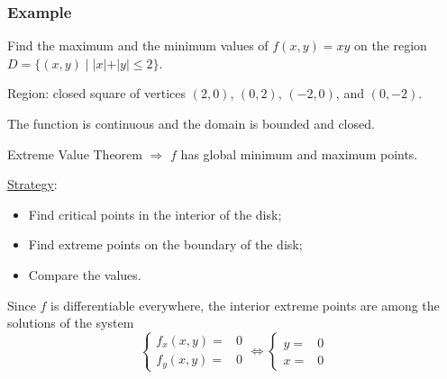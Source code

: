 

\begin{frame}
  \frametitle{Example}

Find the maximum and the minimum values of $f(x,y) = xy$ on the region $D = \{ (x,y) \; | \; |x|+|y| \leqslant 2 \}$.
\pause

Region: \pause closed square of vertices $(2,0)$, $(0,2)$, $(-2,0)$, and $(0,-2)$.

\pause

The function is continuous and the domain is bounded and closed.

Extreme Value Theorem $\Longrightarrow$ $f$ has global minimum and maximum points.

\pause
\underline{Strategy}:
%
\begin{itemize}
  \item Find critical points in the interior of the disk;
  \item Find extreme points on the boundary of the disk;
  \item Compare the values.
\end{itemize}

\pause
Since $f$ is differentiable everywhere, the interior extreme points are among the solutions of the system
%
$$\left\{
\begin{array}{ll}
  f_x(x,y) = &  0 \\
  f_y(x,y) = &  0
\end{array}
\right.
%
\Longleftrightarrow
%
\left\{
\begin{array}{ll}
  y = &  0 \\
  x= &  0
\end{array}
\right.
$$
\end{frame}




